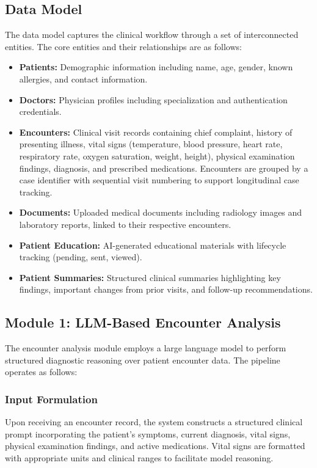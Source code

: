 \documentclass[conference]{IEEEtran}
\begin{document}
\subsection{Data Model}

The data model captures the clinical workflow through a set of interconnected entities. The core entities and their relationships are as follows:

\begin{itemize}
    \item \textbf{Patients:} Demographic information including name, age, gender, known allergies, and contact information.
    \item \textbf{Doctors:} Physician profiles including specialization and authentication credentials.
    \item \textbf{Encounters:} Clinical visit records containing chief complaint, history of presenting illness, vital signs (temperature, blood pressure, heart rate, respiratory rate, oxygen saturation, weight, height), physical examination findings, diagnosis, and prescribed medications. Encounters are grouped by a case identifier with sequential visit numbering to support longitudinal case tracking.
    \item \textbf{Documents:} Uploaded medical documents including radiology images and laboratory reports, linked to their respective encounters.
    \item \textbf{Patient Education:} AI-generated educational materials with lifecycle tracking (pending, sent, viewed).
    \item \textbf{Patient Summaries:} Structured clinical summaries highlighting key findings, important changes from prior visits, and follow-up recommendations.
\end{itemize}

\subsection{Module 1: LLM-Based Encounter Analysis}

The encounter analysis module employs a large language model to perform structured diagnostic reasoning over patient encounter data. The pipeline operates as follows:

\subsubsection{Input Formulation}
Upon receiving an encounter record, the system constructs a structured clinical prompt incorporating the patient's symptoms, current diagnosis, vital signs, physical examination findings, and active medications. Vital signs are formatted with appropriate units and clinical ranges to facilitate model reasoning.
\end{document}
